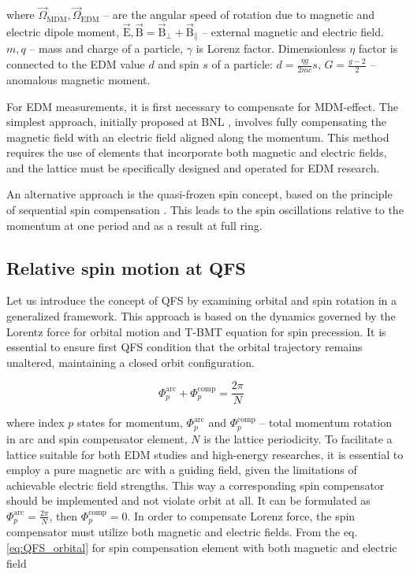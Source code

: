 \documentclass[submitting]{nst}
\begin{document}
\noindent where $\vec{\Omega}_{\text{MDM}}, \vec{\Omega}_{\text{EDM}}$ -- are the angular speed of rotation due to magnetic and electric dipole moment, $\vec{\mathrm{E}}, \vec{\mathrm{B}} = \vec{\mathrm{B}}_{\perp} + \vec{\mathrm{B}}_{\|}$ -- external magnetic and electric field. $m, q$ -- mass and charge of a particle, $\gamma$ is Lorenz factor. Dimensionless $\eta$ factor is connected
to the EDM value $d$ and spin $s$ of a particle: $d = \frac{\eta g}{2mc}s$, $G=\frac{g-2}{2}$ -- 
anomalous magnetic moment. 

\par For EDM measurements, it is first necessary to compensate for MDM-effect. The simplest approach, initially proposed at BNL \cite{AGS}, involves fully compensating the magnetic field with an electric field aligned along the momentum. This method requires the use of elements that incorporate both magnetic and electric fields, and the lattice must be specifically designed and operated for EDM research.
\par An alternative approach is the quasi-frozen spin concept, based on the principle of sequential spin compensation \cite{QFS}. This leads to the spin oscillations relative to the momentum at one period and as a result at full ring.

\subsection{Relative spin motion at QFS}    

\par Let us introduce the concept of QFS by examining orbital and spin rotation in a generalized framework. This approach is based on the dynamics governed by the Lorentz force for orbital motion and T-BMT equation for spin precession. It is essential to ensure first QFS condition that the orbital trajectory remains unaltered, maintaining a closed orbit configuration.

\begin{equation}
	\Phi_p^{\textrm{arc}}+\Phi_{p}^{\textrm{comp}}=\frac{2\pi}{N}\ \ \
	\label{eq:QFS_orbital}
\end{equation}

\noindent where index $p$ states for momentum, $\Phi_p^{\textrm{arc}}$ and $\Phi_{p}^{\textrm{comp}}$ -- total momentum rotation in arc and spin compensator element, $N$ is the lattice periodicity. To facilitate a lattice suitable for both EDM studies and high-energy researches, it is essential to employ a pure magnetic arc with a guiding field, given the limitations of achievable electric field strengths. This way a corresponding spin compensator should be implemented and not violate orbit at all. It can be formulated as $\Phi_p^{\textrm{arc}} = \frac{2\pi}{N}$, then $\Phi_{p}^{\textrm{comp}} = 0$. In order to compensate Lorenz force, the spin compensator must utilize both magnetic and electric fields. From the eq. \ref{eq:QFS_orbital} for spin compensation element with both magnetic and electric field
\end{document}
